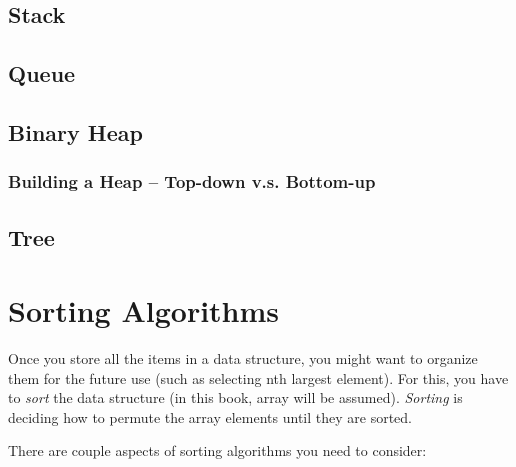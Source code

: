 \documentclass{report}
\begin{document}
\section{Stack}

\section{Queue}

\section{Binary Heap}

\subsection{Building a Heap -- Top-down v.s. Bottom-up}

\section{Tree}


\chapter{Sorting Algorithms}

Once you store all the items in a data structure, you might want to organize them for the future use (such as selecting nth largest element). For this, you have to \textit{sort} the data structure (in this book, array will be assumed). \textit{Sorting} is deciding how to permute the array elements until they are sorted.

There are couple aspects of sorting algorithms you need to consider:
\end{document}
